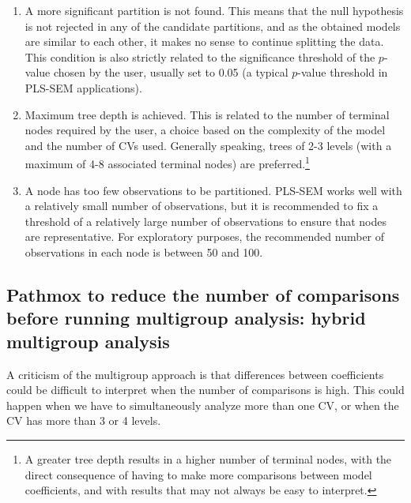 \begin{enumerate}
\def\labelenumi{\arabic{enumi}.}
\item
  A more significant partition is not found. This means that the null
  hypothesis is not rejected in any of the candidate partitions, and
  as the obtained models are similar to each other, it makes no sense
  to continue splitting the data. This condition is also strictly
  related to the significance threshold of the \(p\)-value chosen by the
  user, usually set to 0.05 (a typical \(p\)-value threshold in PLS-SEM
  applications).
\item
  Maximum tree depth is achieved. This is related to the number of
  terminal nodes required by the user, a choice based on the
  complexity of the model and the number of CVs used. Generally
  speaking, trees of 2-3 levels (with a maximum of 4-8 associated
  terminal nodes) are preferred.\footnote{A greater tree depth results in a higher number of terminal nodes,
    with the direct consequence of having to make more comparisons
    between model coefficients, and with results that may not always be
    easy to interpret.}
\item
  A node has too few observations to be partitioned. PLS-SEM works
  well with a relatively small number of observations, but it is
  recommended to fix a threshold of a relatively large number of
  observations to ensure that nodes are representative. For
  exploratory purposes, the recommended number of observations in each
  node is between 50 and 100. ~
\end{enumerate}

\hypertarget{pathmox-to-reduce-the-number-of-comparisons-before-running-multigroup-analysis-hybrid-multigroup-analysis}{%
\subsection{Pathmox to reduce the number of comparisons before running multigroup analysis: hybrid multigroup analysis}\label{pathmox-to-reduce-the-number-of-comparisons-before-running-multigroup-analysis-hybrid-multigroup-analysis}}

A criticism of the multigroup approach is that differences between
coefficients could be difficult to interpret when the number of
comparisons is high. This could happen when we have to simultaneously
analyze more than one CV, or when the CV has more than 3 or 4 levels.

